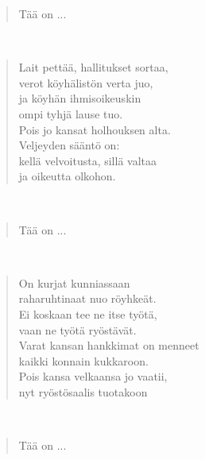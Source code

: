 \noindent\begin{minipage}{\linewidth}
\begin{verse}
	Tää on ...\\
\end{verse}
\end{minipage}\\[10pt]
\noindent\begin{minipage}{\linewidth}
\begin{verse}
	Lait pettää, hallitukset sortaa,\\
	verot köyhälistön verta juo,\\
	ja köyhän ihmisoikeuskin\\
	ompi tyhjä lause tuo.\\
	Pois jo kansat holhouksen alta.\\
	Veljeyden sääntö on:\\
	kellä velvoitusta, sillä valtaa\\
	ja oikeutta olkohon.\\
\end{verse}
\end{minipage}\\[10pt]
\noindent\begin{minipage}{\linewidth}
\begin{verse}
	Tää on ...\\
\end{verse}
\end{minipage}\\[10pt]
\noindent\begin{minipage}{\linewidth}
\begin{verse}
	On kurjat kunniassaan\\
	raharuhtinaat nuo röyhkeät.\\
	Ei koskaan tee ne itse työtä,\\
	vaan ne työtä ryöstävät.\\
	Varat kansan hankkimat on menneet\\
	kaikki konnain kukkaroon.\\
	Pois kansa velkaansa jo vaatii,\\
	nyt ryöstösaalis tuotakoon\\
\end{verse}
\end{minipage}\\[10pt]
\noindent\begin{minipage}{\linewidth}
\begin{verse}
	Tää on ...\\
\end{verse}
\end{minipage}\\[10pt]

